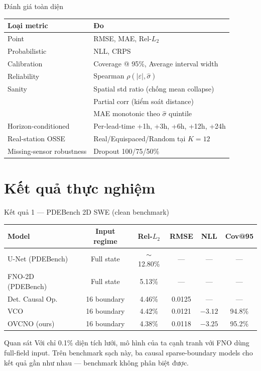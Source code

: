 \documentclass[11pt,aspectratio=169]{beamer}
\begin{document}
\begin{frame}{Đánh giá toàn diện}
  \small
  \begin{tabular}{@{}l p{8cm}@{}}
    \toprule
    \textbf{Loại metric} & \textbf{Đo} \\
    \midrule
    Point & RMSE, MAE, Rel-$L_2$ \\
    Probabilistic & NLL, CRPS \\
    Calibration & Coverage @ 95\%, Average interval width \\
    Reliability & Spearman $\rho(|\varepsilon|, \hat{\sigma})$ \\
    Sanity & Spatial std ratio (chống mean collapse) \\
    & Partial corr (kiểm soát distance) \\
    & MAE monotonic theo $\hat\sigma$ quintile \\
    Horizon-conditioned & Per-lead-time +1h, +3h, +6h, +12h, +24h \\
    Real-station OSSE & Real/Equispaced/Random tại $K{=}12$ \\
    Missing-sensor robustness & Dropout 100/75/50\% \\
    \bottomrule
  \end{tabular}
\end{frame}

\section{Kết quả thực nghiệm}

\begin{frame}{Kết quả 1 --- PDEBench 2D SWE (clean benchmark)}
  \small \centering
  \begin{tabular}{@{}l c c c c c@{}}
    \toprule
    \textbf{Model} & \textbf{Input regime} & \textbf{Rel-$L_2$} & \textbf{RMSE} & \textbf{NLL} & \textbf{Cov@95} \\
    \midrule
    U-Net (PDEBench) & Full state & $\sim$12.80\% & --- & --- & --- \\
    FNO-2D (PDEBench) & Full state & 5.13\% & --- & --- & --- \\
    \midrule
    Det. Causal Op. & 16 boundary & 4.46\% & 0.0125 & --- & --- \\
    VCO & 16 boundary & 4.42\% & 0.0121 & $-3.12$ & 94.8\% \\
    \alert{OVCNO (ours)} & \alert{16 boundary} & \alert{4.38\%} & \alert{0.0118} & \alert{$-3.25$} & \alert{95.2\%} \\
    \bottomrule
  \end{tabular}

  \vspace{12pt}
  \begin{block}{Quan sát}
    Với chỉ \alert{0.1\% diện tích lưới}, mô hình của ta cạnh tranh với FNO dùng full-field input. Trên benchmark sạch này, ba causal sparse-boundary models cho kết quả gần như nhau --- benchmark không phân biệt được.
  \end{block}
\end{frame}
\end{document}
